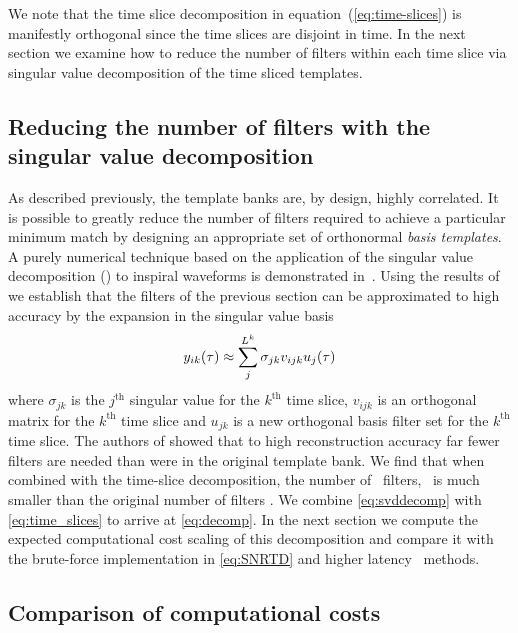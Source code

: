 We note that
the time slice decomposition in equation~(\ref{eq:time-slices}) is manifestly
orthogonal since the time slices are disjoint in time.  In the next
section we examine how to reduce the number of filters within each time slice via
singular value decomposition of the time sliced templates.

\subsection{Reducing the number of filters with the singular value
decomposition}

As described previously, the template banks are, by design, highly correlated.
It is possible to greatly reduce the number of filters required to achieve a
particular minimum match by designing an appropriate set of orthonormal {\em
basis templates}.  A purely numerical technique based on the application of the
singular value decomposition (\SVD) to inspiral waveforms is demonstrated
in~\cite{Cannon:2010p10398}.  Using the results of ~\cite{Cannon:2010p10398} we
establish that the filters of the previous section can be approximated to high
accuracy by the expansion in the singular value basis
%
\begin{equation}
y_{ik}(\tau) \approx \sum_j^{L^k} \sigma_{jk} v_{ijk} u_{j}(\tau)
\label{eq:svddecomp}
\end{equation}
%
where $\sigma_{jk}$ is the $j^{\mathrm{th}}$ singular value for the
$k^{\mathrm{th}}$ time slice, $v_{ijk}$ is an orthogonal matrix for the
$k^{\mathrm{th}}$ time slice  and $u_{jk}$ is a new orthogonal basis filter set
for the $k^{\mathrm{th}}$ time slice.  The authors of \cite{Cannon:2010p10398}
showed that to high reconstruction accuracy far fewer filters are needed than
were in the original template bank. We find that when combined with the
time-slice decomposition, the number of \SVD\ filters, \numsvdtmps\ is much smaller
than the original number of filters \numtmps.  We combine \eqref{eq:svddecomp}
with \eqref{eq:time_slices} to arrive at \eqref{eq:decomp}.  In the next
section we compute the expected computational cost scaling of this
decomposition and compare it with the brute-force implementation in
\eqref{eq:SNRTD} and higher latency \fft\ methods.

\subsection{Comparison of computational costs}

